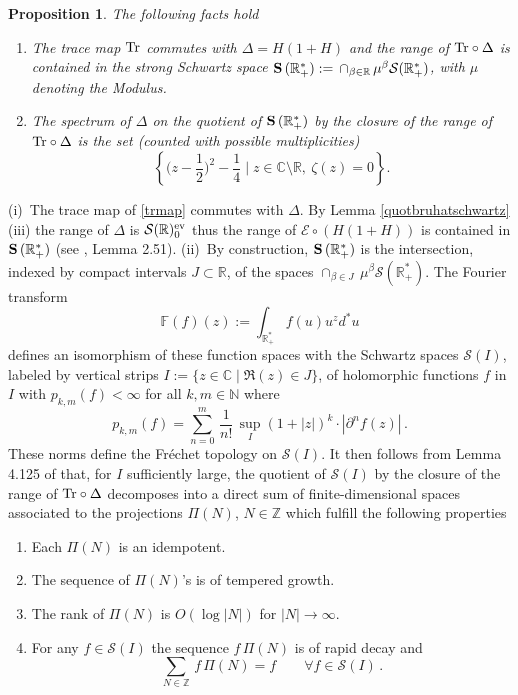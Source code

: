\documentclass{pspum-l}
\newtheorem{proposition}[theorem]{Proposition}
\theoremstyle{definition}
\theoremstyle{remark}
\numberwithin{equation}{section}
\def\C{{\mathbb C}}
\def\F{{\mathbb F}}
\def\R{{\mathbb R}}
\def\Z{{\mathbb Z}}
\def\cE{{\mathcal E}}
\def\cS{{\mathcal S}}
\def\tr{{\rm Tr}}
\def\fourier{\F}
\def\N{{\mathbb N}}
\def\strong{{\bf S\,}}
\begin{document}
  \begin{proposition} \label{laplacian} The following facts hold
  \begin{enumerate}
      \item[(i)] The trace map $\tr$ commutes with $\Delta=H(1+H)$ and the range of $\tr\circ \Delta$ is contained in the strong Schwartz space $\strong(\R_+^*):=\,\cap_{\beta \in \R}\,\mu^\beta \cS(\R_+^*)$, with
      $\mu$ denoting the Modulus.
  \item[(ii)] The spectrum of $\Delta$ on the quotient of  $\strong(\R_+^*)$ by the closure of the range of  $\tr\circ \Delta$ is the set (counted with possible multiplicities)
  \[
  \left\{\Big(z-\frac 12\Big)^2-\frac 14\mid  z\in \C\setminus \R, ~ \zeta(z)=0\right\}.
  \]
  \end{enumerate}
  \end{proposition}
\proof (i)~The trace map of \eqref{trmap}  commutes with $\Delta$. By Lemma \ref{quotbruhatschwartz} (iii) the range of $\Delta$ is $\cS(\R)_0^{\rm ev}$ thus the range of $\cE\circ(H(1+H))$ is contained in  $\strong(\R_+^*)$ (see \cite{CMbook}, Lemma 2.51).\newline
(ii)~By construction,  $\strong(\R_+^*)$ is  the intersection, indexed by compact intervals $J\subset \R$, of  
the spaces $\cap_{\beta \in J}\,\mu^\beta \cS(\R_+^*) $. The Fourier transform  
\begin{equation*}\label{fouriermellin}
\fourier(f)(z):=\int_{\R_+^*}f(u)u^z d^*u	
\end{equation*}
defines an isomorphism of these function spaces with the Schwartz spaces $\cS(I)$, labeled by vertical strips $I:=\{z\in \C\mid \Re(z)\in J\}$,
of holomorphic functions $f$ in $I$ with $p_{k,m}(f)<\infty$ for all $k,m\in\N$ where 
\begin{equation*}\label{seminormspkm}
p_{k,m}(f)=\sum_{n=0}^m\,\frac{1}{n!}\,\sup_I (1+|z|)^k\cdot|\partial^n
f(z)|\,.
\end{equation*}
These norms define the Fr\'echet topology on $\cS(I)$. \newline
It then follows from Lemma 4.125 of \cite{CMbook} that, for $I$ sufficiently large, the quotient of $\cS(I)$  by the closure of the range of  $\tr\circ \Delta$ decomposes into a direct sum of finite-dimensional spaces associated to the projections $\Pi(N)$, $N\in \Z$ which fulfill the following properties
\begin{enumerate}
  \item Each $\Pi(N)$  is an idempotent.
  \item The sequence of $\Pi(N)$'s  is of tempered growth. 
   \item The rank of $\Pi(N)$  is $O(\log |N|)$ for $|N|\to \infty$.
   \item For any $f\in \cS(I)$ the sequence $f\,\Pi(N)$ is of rapid
   decay and 
   \begin{equation*}\label{opPiN6}
\sum_{N\in\Z}\,f\,\Pi(N)=f \qquad \forall f\in \cS(I)\,.
\end{equation*}
\end{enumerate}
\end{document}
